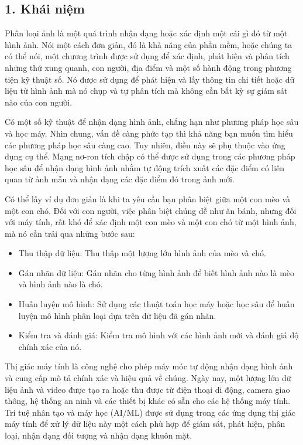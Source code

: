 \documentclass[../main.tex]{subfiles}
\begin{document}
\subsection*{1. Khái niệm}

Phân loại ảnh là một quá trình nhận dạng hoặc xác định một cái gì đó từ một hình ảnh. Nói một cách đơn giản, đó là khả năng của phần mềm, hoặc chúng ta có thể nói, một chương trình được sử dụng để xác định, phát hiện và phân tích những thứ xung quanh, con người, địa điểm và một số hành động trong phương tiện kỹ thuật số. Nó được sử dụng để phát hiện và lấy thông tin chi tiết hoặc dữ liệu từ hình ảnh mà nó chụp và tự phân tích mà không cần bất kỳ sự giám sát nào của con người.

Có một số kỹ thuật để nhận dạng hình ảnh, chẳng hạn như phương pháp học sâu và học máy. Nhìn chung, vấn đề càng phức tạp thì khả năng bạn muốn tìm hiểu các phương pháp học sâu càng cao. Tuy nhiên, điều này sẽ phụ thuộc vào ứng dụng cụ thể. Mạng nơ-ron tích chập có thể được sử dụng trong các phương pháp học sâu để nhận dạng hình ảnh nhằm tự động trích xuất các đặc điểm có liên quan từ ảnh mẫu và nhận dạng các đặc điểm đó trong ảnh mới.

Có thể lấy ví dụ đơn giản là khi ta yêu cầu bạn phân biệt giữa một con mèo và một con chó. Đối với con người, việc phân biệt chúng dễ như ăn bánh, nhưng đối với máy tính, rất khó để xác định một con mèo và một con chó từ một hình ảnh, mà nó cần trải qua những bước sau:

\begin{itemize}
    \item Thu thập dữ liệu: Thu thập một lượng lớn hình ảnh của mèo và chó.
    \item Gán nhãn dữ liệu: Gán nhãn cho từng hình ảnh để biết hình ảnh nào là mèo và hình ảnh nào là chó.
    \item Huấn luyện mô hình: Sử dụng các thuật toán học máy hoặc học sâu để huấn luyện mô hình phân loại dựa trên dữ liệu đã gán nhãn.
    \item Kiểm tra và đánh giá: Kiểm tra mô hình với các hình ảnh mới và đánh giá độ chính xác của nó.
\end{itemize}

Thị giác máy tính là công nghệ cho phép máy móc tự động nhận dạng hình ảnh và cung cấp mô tả chính xác và hiệu quả về chúng. Ngày nay, một lượng lớn dữ liệu ảnh và video được tạo ra hoặc thu được từ điện thoại di động, camera giao thông, hệ thống an ninh và các thiết bị khác có sẵn cho các hệ thống máy tính. Trí tuệ nhân tạo và máy học (AI/ML) được sử dụng trong các ứng dụng thị giác máy tính để xử lý dữ liệu này một cách phù hợp để giám sát, phát hiện, phân loại, nhận dạng đối tượng và nhận dạng khuôn mặt.
\end{document}
